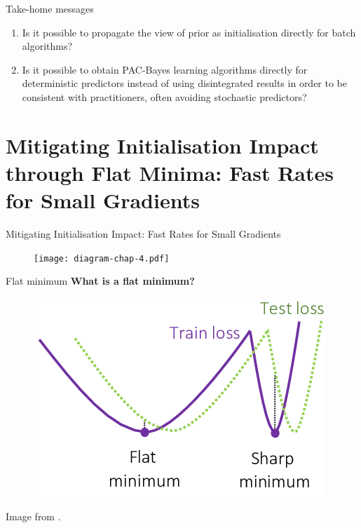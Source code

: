 \documentclass{presentation}
\begin{document}
  \begin{xframe}{Take-home messages}
    \vspace{0.5cm}
    {}\\
    \vspace{1cm}
    {}

    \begin{enumerate}
        \item Is it possible to propagate the view of prior as initialisation directly for batch algorithms?
        \item Is it possible to obtain PAC-Bayes learning algorithms directly for deterministic predictors instead of using disintegrated results in order to be consistent with practitioners, often avoiding stochastic predictors?
    \end{enumerate}
    
  \end{xframe}


\section{Mitigating Initialisation Impact through Flat Minima: Fast Rates for Small Gradients}

\begin{xframe}{Mitigating Initialisation Impact: Fast Rates for Small Gradients}
    \begin{figure}
        \centering
        \texttt{[image: diagram-chap-4.pdf]}
    \end{figure}
  \end{xframe}

\begin{xframe}{Flat minimum}
    \textbf{What is a flat minimum?}
    \\
    \vspace{1cm}
    \begin{figure}
        \includegraphics[scale= 0.5]{figures/flat-minima.png} 
    \end{figure}
{\tiny Image from \citet{liebenwein2021sparse}. }
\end{xframe}
\end{document}
